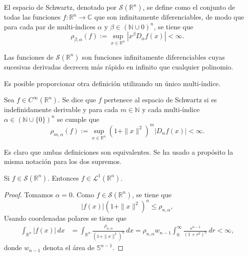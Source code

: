 \begin{definicion}\label{def111}

\noindent El espacio de Schwartz, denotado por \( \mathscr{S}(\mathbb{R}^n) \), se define como el conjunto de todas las funciones \( f: \mathbb{R}^n \rightarrow \mathbb{C} \) que son infinitamente diferenciables, de modo que para cada par de multi-índices $\alpha$ y $\beta \in (\mathbb{N}\cup 0)^n$, se tiene que
\[
\rho_{\beta, \alpha}(f) := \sup_{x \in \mathbb{R}^n} |x^\beta D_\alpha f(x)| < \infty.
\]
\end{definicion}
\begin{observacion}
    Las funciones de \( \mathscr{S}(\mathbb{R}^n) \) son funciones infinitamente diferenciables cuyas sucesivas derivadas decrecen más rápido en infinito que cualquier polinomio.
\end{observacion}

\noindent Es posible proporcionar otra definición utilizando un único multi-índice.

\begin{definicion}
Sea \(f \in C^{\infty}(\mathbb{R}^n)\). Se dice que \(f\) pertenece al espacio de Schwartz si es indefinidamente derivable y para cada \(m \in \mathbb{N}\) y cada multi-índice \(\alpha \in (\mathbb{N}\cup \{0\})^n\) se cumple que
\[
\rho_{m, \alpha}(f) := \sup_{x \in \mathbb{R}^n} (1+\|x\|^2)^m |D_\alpha f(x)|  < \infty.
\]
\end{definicion}
\noindent Es claro que ambas definiciones son equivalentes. Se ha usado a propósito la misma notación para los dos supremos.

\begin{proposicion}\label{profdif1}
    Si $f \in \mathscr{S}(\mathbb{R}^n)$. Entonces $f \in \mathscr{L}^1(\mathbb{R}^n)$.
\end{proposicion}

\begin{proof}
Tomamos $\alpha = 0$. Como $f \in \mathscr{S}(\mathbb{R}^n)$, se tiene que 
\begin{equation}
    |f(x)|(1+\|x\|^2)^n \leq \rho_{n,\alpha},
\end{equation}
Usando coordenadas polares se tiene que
\begin{equation*}
\begin{aligned}
   \int_{\mathbb{R}^n}|f(x)| \, dx &= \int_{\mathbb{R}^n}\frac{\rho_{n,\alpha}}{(1+\|x\|^2)^n} \, dx = \rho_{n,\alpha}w_{n-1}\int_{0}^{\infty} \frac{r^{n-1}}{(1+r^2)^n} \, dr < \infty,
   \end{aligned}
\end{equation*} 
\noindent donde $w_{n-1}$ denota el área de $\mathbb{S}^{n-1}$.
\end{proof}

